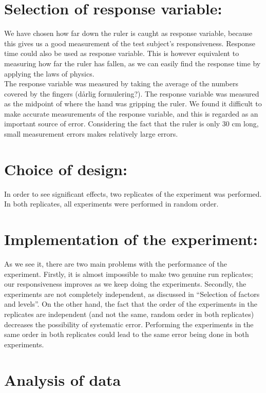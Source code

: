 \documentclass[]{article}
\begin{document}
\section{Selection of response
variable:}\label{selection-of-response-variable}

We have chosen how far down the ruler is caught as response variable,
because this gives us a good measurement of the test subject's
responsiveness. Response time could also be used as response variable.
This is however equivalent to measuring how far the ruler has fallen, as
we can easily find the response time by applying the laws of physics.\\
The response variable was measured by taking the average of the numbers
covered by the fingers (dårlig formulering?). The response variable was
measured as the midpoint of where the hand was gripping the ruler. We
found it difficult to make accurate measurements of the response
variable, and this is regarded as an important source of error.
Considering the fact that the ruler is only 30 cm long, small
measurement errors makes relatively large errors.

\section{Choice of design:}\label{choice-of-design}

In order to see significant effects, two replicates of the experiment
was performed. In both replicates, all experiments were performed in
random order.

\section{Implementation of the
experiment:}\label{implementation-of-the-experiment}

As we see it, there are two main problems with the performance of the
experiment. Firstly, it is almost impossible to make two genuine run
replicates; our responsiveness improves as we keep doing the
experiments. Secondly, the experiments are not completely independent,
as discussed in ``Selection of factors and levels''. On the other hand,
the fact that the order of the experiments in the replicates are
independent (and not the same, random order in both replicates)
decreases the possibility of systematic error. Performing the
experiments in the same order in both replicates could lead to the same
error being done in both experiments.

\section{Analysis of data}\label{analysis-of-data}
\end{document}
